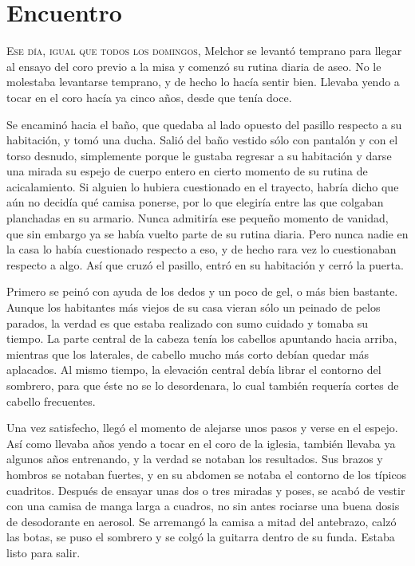 

\chapter{Encuentro}
\lettrine{E}{se día, igual que todos los domingos,} Melchor se levantó temprano para llegar al ensayo del coro previo a la misa y comenzó su rutina diaria de aseo. No le molestaba levantarse temprano, y de hecho lo hacía sentir bien.
Llevaba yendo a tocar en el coro hacía ya cinco años, desde que tenía doce.

Se encaminó hacia el baño, que quedaba al lado opuesto del pasillo respecto a su habitación, y tomó una ducha. Salió del baño vestido sólo con pantalón y con el torso desnudo, simplemente porque le gustaba regresar a su habitación y darse una mirada su espejo de cuerpo entero
en cierto momento de su rutina de acicalamiento.
Si alguien lo hubiera cuestionado en el trayecto, habría dicho que aún no decidía qué camisa ponerse, por lo que elegiría entre las que colgaban planchadas en su armario. Nunca admitiría ese pequeño momento de vanidad, que sin embargo ya se había vuelto parte de su rutina diaria. Pero nunca nadie en la casa lo había
cuestionado respecto a eso, y de hecho rara vez lo cuestionaban respecto a algo.
Así que cruzó el pasillo, entró en su habitación y cerró la puerta.

Primero se peinó con ayuda de los dedos y un poco de gel, o más bien bastante.
Aunque los habitantes más viejos de su casa vieran sólo un peinado de pelos parados,
la verdad es que estaba realizado con sumo cuidado y tomaba su tiempo.
La parte central de la cabeza tenía los cabellos apuntando hacia arriba, mientras que los
laterales, de cabello mucho más corto debían quedar más aplacados.
Al mismo tiempo, la elevación central debía librar el contorno del sombrero, para que éste no
se lo desordenara, lo cual también requería cortes de cabello frecuentes.

Una vez satisfecho, llegó el momento de alejarse unos pasos y verse en el espejo.
Así como llevaba años yendo a tocar en el coro de la iglesia, también llevaba ya algunos años entrenando,
y la verdad se notaban los resultados.
Sus brazos y hombros se notaban fuertes, y en su abdomen se notaba el contorno de los típicos cuadritos.
Después de ensayar unas dos o tres miradas y poses, se acabó de vestir con una camisa de manga larga a cuadros, no sin antes rociarse una buena dosis de desodorante en aerosol.
Se arremangó la camisa a mitad del antebrazo, calzó las botas, se puso el sombrero y se colgó la
guitarra dentro de su funda. Estaba listo para salir.


